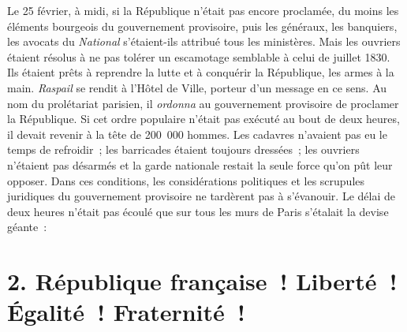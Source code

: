 \documentclass[french,twoside]{book} %
\begin{document}
Le 25 février, à midi, si la République n’était pas encore proclamée, du moins les éléments bourgeois du gouvernement provisoire, puis les généraux, les banquiers, les avocats du \emph{National} s’étaient-ils attribué tous les ministères. Mais les ouvriers étaient résolus à ne pas tolérer un escamotage semblable à celui de juillet 1830. Ils étaient prêts à reprendre la lutte et à conquérir la République, les armes à la main. \emph{Raspail} se rendit à l’Hôtel de Ville, porteur d’un message en ce sens. Au nom du prolétariat parisien, il \emph{ordonna} au gouvernement provisoire de proclamer la République. Si cet ordre populaire n’était pas exécuté au bout de deux heures, il devait revenir à la tête de 200 000 hommes. Les cadavres n’avaient pas eu le temps de refroidir ; les barricades étaient toujours dressées ; les ouvriers n’étaient pas désarmés et la garde nationale restait la seule force qu’on pût leur opposer. Dans ces conditions, les considérations politiques et les scrupules juridiques du gouvernement provisoire ne tardèrent pas à s’évanouir. Le délai de deux heures n’était pas écoulé que sur tous les murs de Paris s’étalait la devise géante :

\section[{2. République française ! Liberté ! Égalité ! Fraternité !}]{2. République française ! Liberté ! Égalité ! Fraternité !}
\end{document}
